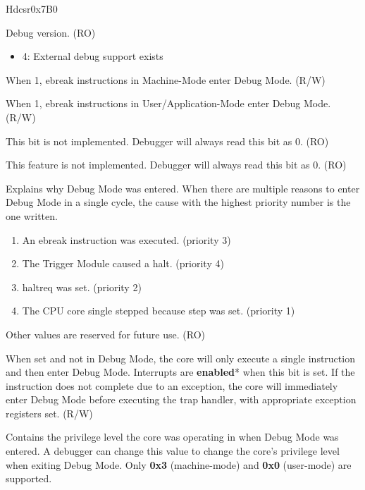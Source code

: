 
\begin{register}{H}{dcsr}{0x7B0}
\label{regdesc:DCSR}
%
%
%
%
%
%
%
%
%
%
%
%
\regnewline%
\begin{regdesc}
\begin{reglist}
\label{fielddesc:DCSRXEDBGVER}\item [xdebugver] Debug version. (RO)
\begin{itemize}
    \setlength\itemsep{-1em}
    \item 4: External debug support exists
\end{itemize}
\label{fielddesc:DCSREBREAKM}\item [ebreakm] When 1, ebreak instructions in Machine-Mode enter Debug Mode. (R/W)
\label{fielddesc:DCSREBREAKU}\item [ebreaku] When 1, ebreak instructions in User/Application-Mode enter Debug Mode. (R/W)
\label{fielddesc:DCSRSTOPCOUNT}\item [stopcount] This bit is not implemented. Debugger will always read this bit as 0. (RO)
\label{fielddesc:DCSRSTOPTIME}\item [stoptime] This feature is not implemented. Debugger will always read this bit as 0. (RO)
\label{fielddesc:DCSRCAUSE}\item [cause] Explains why Debug Mode was entered. When there are multiple reasons to enter Debug \newline Mode in a single cycle, the cause with the highest priority number is the one written.
\begin{enumerate}
    \setlength\itemsep{-1em}
    \item An ebreak instruction was executed. (priority 3)
    \item The Trigger Module caused a halt. (priority 4)
    \item haltreq was set. (priority 2)
    \item The CPU core single stepped because step was set. (priority 1)
\end{enumerate}
Other values are reserved for future use. (RO)
\label{fielddesc:DCSRSTEP}\item [step] When set and not in Debug Mode, the core will only execute a single instruction and then enter Debug Mode. Interrupts are \textbf{enabled}* when this bit is set. If the instruction does not complete due to an exception, the core will immediately enter Debug Mode before executing the trap handler, with appropriate exception registers set. (R/W)
\label{fielddesc:DCSRPRV}\item [prv] Contains the privilege level the core was operating in when Debug Mode was entered. A debugger can change this value to change the core's privilege level when exiting Debug Mode. Only \textbf{0x3} (machine-mode) and \textbf{0x0} (user-mode) are supported.
\end{reglist}
\end{regdesc}
\end{register}
